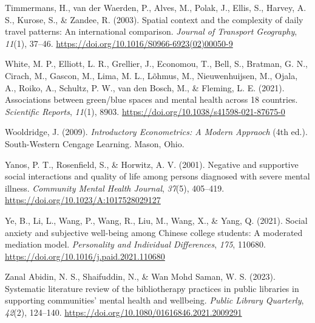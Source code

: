 \documentclass[
  letterpaper,
  number,
  review,
  3p]{elsarticle}
\newlength{\cslhangindent}
\newenvironment{CSLReferences}[2] %
 {\begin{list}{}{%
  \setlength{\itemindent}{0pt}
  \setlength{\leftmargin}{0pt}
  \setlength{\parsep}{0pt}
  \ifodd #1
   \setlength{\leftmargin}{\cslhangindent}
   \setlength{\itemindent}{-1\cslhangindent}
  \fi
  \setlength{\itemsep}{#2\baselineskip}}}
 {\end{list}}
\begin{document}
\begin{CSLReferences}{1}{0}
Timmermans, H., van der Waerden, P., Alves, M., Polak, J., Ellis, S.,
Harvey, A. S., Kurose, S., \& Zandee, R. (2003). Spatial context and the
complexity of daily travel patterns: An international comparison.
\emph{Journal of Transport Geography}, \emph{11}(1), 37--46.
\url{https://doi.org/10.1016/S0966-6923(02)00050-9}

White, M. P., Elliott, L. R., Grellier, J., Economou, T., Bell, S.,
Bratman, G. N., Cirach, M., Gascon, M., Lima, M. L., Lõhmus, M.,
Nieuwenhuijsen, M., Ojala, A., Roiko, A., Schultz, P. W., van den Bosch,
M., \& Fleming, L. E. (2021). Associations between green/blue spaces and
mental health across 18 countries. \emph{Scientific Reports},
\emph{11}(1), 8903. \url{https://doi.org/10.1038/s41598-021-87675-0}

Wooldridge, J. (2009). \emph{Introductory {Econometrics}: {A Modern
Appraoch}} (4th ed.). South-Western Cengage Learning. Mason, Ohio.

Yanos, P. T., Rosenfield, S., \& Horwitz, A. V. (2001). Negative and
supportive social interactions and quality of life among persons
diagnosed with severe mental illness. \emph{Community Mental Health
Journal}, \emph{37}(5), 405--419.
\url{https://doi.org/10.1023/A:1017528029127}

Ye, B., Li, L., Wang, P., Wang, R., Liu, M., Wang, X., \& Yang, Q.
(2021). Social anxiety and subjective well-being among {Chinese} college
students: {A} moderated mediation model. \emph{Personality and
Individual Differences}, \emph{175}, 110680.
\url{https://doi.org/10.1016/j.paid.2021.110680}

Zanal Abidin, N. S., Shaifuddin, N., \& Wan Mohd Saman, W. S. (2023).
Systematic literature review of the bibliotherapy practices in public
libraries in supporting communities' mental health and wellbeing.
\emph{Public Library Quarterly}, \emph{42}(2), 124--140.
\url{https://doi.org/10.1080/01616846.2021.2009291}

\end{CSLReferences}
\end{document}
